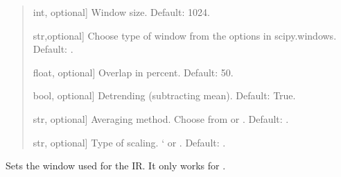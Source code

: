 \documentclass[letterpaper,10pt,english]{sphinxmanual}
\begin{document}
\begin{fulllineitems}
\begin{fulllineitems}
\begin{quote}
\begin{description}
\begin{description}
\sphinxlineitem{\sphinxstylestrong{window\_length\_samples}}{[}int, optional{]}
\sphinxAtStartPar
Window size. Default: 1024.

\sphinxlineitem{\sphinxstylestrong{window\_type}}{[}str,optional{]}
\sphinxAtStartPar
Choose type of window from the options in scipy.windows.
Default: .

\sphinxlineitem{\sphinxstylestrong{overlap\_percent}}{[}float, optional{]}
\sphinxAtStartPar
Overlap in percent. Default: 50.

\sphinxlineitem{\sphinxstylestrong{detrend}}{[}bool, optional{]}
\sphinxAtStartPar
Detrending (subtracting mean). Default: True.

\sphinxlineitem{\sphinxstylestrong{average}}{[}str, optional{]}
\sphinxAtStartPar
Averaging method. Choose from  or .
Default: .

\sphinxlineitem{\sphinxstylestrong{scaling}}{[}str, optional{]}
\sphinxAtStartPar
Type of scaling. ‘ or . Default: .

\end{description}

\end{description}\end{quote}

\end{fulllineitems}


\begin{fulllineitems}
\label{\detokenize{classes:dsptools.classes.signal_class.Signal.set_window}}
\pysigstartsignatures
{}
\pysigstopsignatures
\sphinxAtStartPar
Sets the window used for the IR. It only works for
.

\end{fulllineitems}


\begin{fulllineitems}
\label{\detokenize{classes:dsptools.classes.signal_class.Signal.signal_id}}
\pysigstartsignatures
{}
\pysigstopsignatures
\end{fulllineitems}


\end{fulllineitems}
\end{document}
